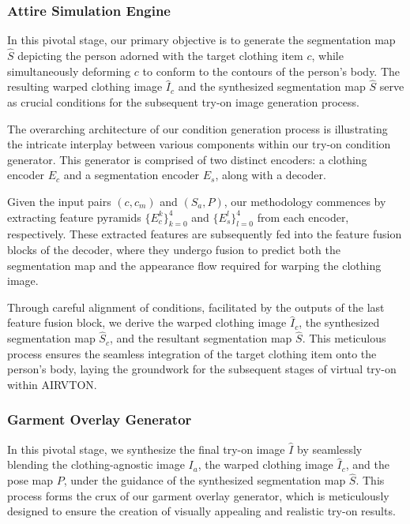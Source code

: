\subsubsection{Attire Simulation Engine}
    In this pivotal stage, our primary objective is to generate the segmentation map \( \hat{S} \) depicting the person adorned with the target clothing item \( c \), while simultaneously deforming \( c \) to conform to the contours of the person's body. The resulting warped clothing image \( \hat{I}_c \) and the synthesized segmentation map \( \hat{S} \) serve as crucial conditions for the subsequent try-on image generation process.

    The overarching architecture of our condition generation process is illustrating the intricate interplay between various components within our try-on condition generator. This generator is comprised of two distinct encoders: a clothing encoder \( E_c \) and a segmentation encoder \( E_s \), along with a decoder.

    Given the input pairs \( (c, c_m) \) and \( (S_a, P) \), our methodology commences by extracting feature pyramids \( \{E_c^k\}_{k=0}^4 \) and \( \{E_s^l\}_{l=0}^4 \) from each encoder, respectively. These extracted features are subsequently fed into the feature fusion blocks of the decoder, where they undergo fusion to predict both the segmentation map and the appearance flow required for warping the clothing image.

    Through careful alignment of conditions, facilitated by the outputs of the last feature fusion block, we derive the warped clothing image \( \hat{I}_c \), the synthesized segmentation map \( \hat{S}_c \), and the resultant segmentation map \( \hat{S} \). This meticulous process ensures the seamless integration of the target clothing item onto the person's body, laying the groundwork for the subsequent stages of virtual try-on within AIRVTON.

\subsubsection{Garment Overlay Generator}
    In this pivotal stage, we synthesize the final try-on image \( \hat{I} \) by seamlessly blending the clothing-agnostic image \( I_a \), the warped clothing image \( \hat{I}_c \), and the pose map \( P \), under the guidance of the synthesized segmentation map \( \hat{S} \). This process forms the crux of our garment overlay generator, which is meticulously designed to ensure the creation of visually appealing and realistic try-on results.

